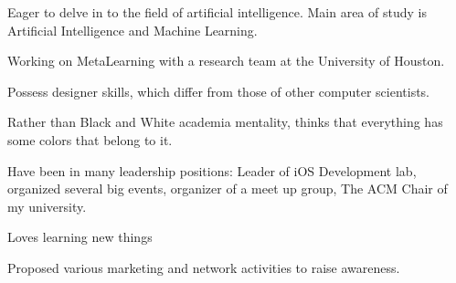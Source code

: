 \begin{cventries}


     {
      \begin{cvitems}
        \item {Eager to delve in to the field of artificial intelligence. Main area of study is Artificial Intelligence and Machine Learning.}
         \item{Working on MetaLearning with a research team at the University of Houston.} 
         \item{Possess designer skills, which differ from those of other computer scientists.} 
         \item{Rather than Black and White academia mentality, thinks that everything has some colors that belong to it. }
         \item{Have been in many leadership positions: Leader of iOS Development lab, organized several big events,  organizer of a meet up group, The ACM Chair of my university.} 
         \item{Loves learning new things}
        \item {Proposed various marketing and network activities to raise awareness.}
      \end{cvitems}
    }
    
\end{cventries}
